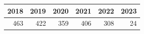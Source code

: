 \begin{tabular}{rrrrrr}\toprule
2018 & 2019 & 2020 & 2021 & 2022 & 2023 \\\midrule
463 & 422 & 359 & 406 & 308 & 24 \\\bottomrule\end{tabular}
